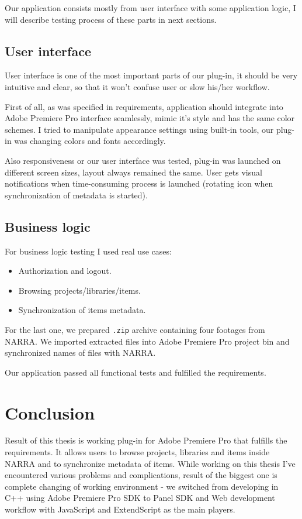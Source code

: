 \documentclass[thesis=B,english]{FITthesis}[2012/10/20]
\begin{document}
Our application consists mostly from user interface with some application logic, I will describe testing process of these parts in next sections.
\section{User interface}
User interface is one of the most important parts of our plug-in, it should be very intuitive and clear, so that it won't confuse user or slow his/her workflow.

First of all, as was specified in requirements, application should integrate into Adobe Premiere Pro interface seamlessly, mimic it's style and has the same color schemes. I tried to manipulate appearance settings using built-in tools, our plug-in was changing colors and fonts accordingly.

Also responsiveness or our user interface was tested, plug-in was launched on different screen sizes, layout always remained the same. User gets visual notifications when time-consuming process is launched (rotating icon when synchronization of metadata is started). 
\section{Business logic}
For business logic testing I used real use cases:
	\begin{itemize}
		\item Authorization and logout.
		\item Browsing projects/libraries/items.
		\item Synchronization of items metadata.
	\end{itemize}
For the last one, we prepared \texttt{.zip} archive containing four footages from NARRA. We imported extracted files into Adobe Premiere Pro project bin and synchronized names of files with NARRA.

Our application passed all functional tests and fulfilled the requirements.
\chapter{Conclusion}
Result of this thesis is working plug-in for Adobe Premiere Pro that fulfills the requirements. It allows users to browse projects, libraries and items inside NARRA and to synchronize metadata of items. While working on this thesis I've encountered various problems and complications, result of the biggest one is complete changing of working environment - we switched from developing in C++ using Adobe Premiere Pro SDK to Panel SDK and Web development workflow with JavaScript and ExtendScript as the main players. 
\end{document}
